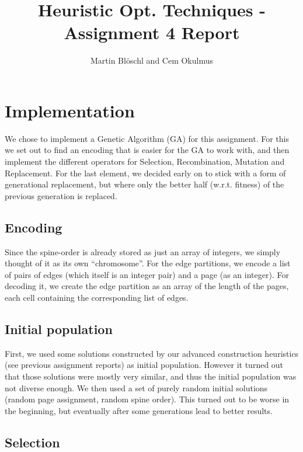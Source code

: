 \documentclass [11pt]{article}
\begin{document}
\title{ Heuristic Opt. Techniques - Assignment 4 Report}
\author{ Martin Blöschl and Cem Okulmus }

\maketitle
\thispagestyle{empty}


\section{Implementation}
We chose to implement a Genetic Algorithm (GA) for this assignment. For this we set out to find an encoding that is easier for the GA to work with, and then implement the different operators for Selection, Recombination, Mutation and Replacement. For the last element, we decided early on to stick with a form of generational replacement, but where only the better  half  (w.r.t. fitness) of the previous generation is replaced. 

\subsection{Encoding}

Since the spine-order is already stored as just an array of integers, we simply thought of it as its own ``chromosome''. For the edge partitions, we encode a list of pairs of edges (which itself is an integer pair) and a page (as an integer). For decoding it, we create the edge partition as an array of the length of the pages, each cell containing the corresponding list of edges.


\subsection{Initial population}

First, we used some solutions constructed by our advanced construction heuristics (see previous assignment reports) as initial population. However it turned out that those solutions were mostly very similar, and thus the initial population was not diverse enough. We then used a set of purely random initial solutions (random page assignment, random spine order). This turned out to be worse in the beginning, but eventually after some generations lead to better results.



\subsection{Selection}
\end{document}
